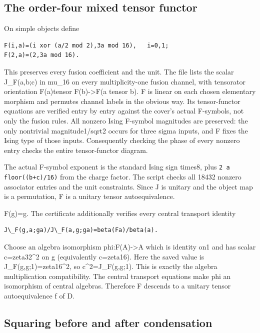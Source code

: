 \hypertarget{the-order-four-mixed-tensor-functor}{%
\subsection{The order-four mixed tensor
functor}\label{the-order-four-mixed-tensor-functor}}

On simple objects define

\begin{verbatim}
F(i,a)=(i xor (a/2 mod 2),3a mod 16),   i=0,1;
F(2,a)=(2,3a mod 16).
\end{verbatim}

This preserves every fusion coefficient and the unit. The file lists the
scalar J\_F(a,b;c) in mu\_16 on every multiplicity-one fusion channel,
with tensorator orientation F(a)tensor F(b)-\textgreater F(a tensor b).
F is linear on each chosen elementary morphism and permutes channel
labels in the obvious way. Its tensor-functor equations are verified
entry by entry against the cover's actual F-symbols, not only the fusion
rules. All nonzero Ising F-symbol magnitudes are preserved: the only
nontrivial magnitude1/sqrt2 occurs for three sigma inputs, and F fixes
the Ising type of those inputs. Consequently checking the phase of every
nonzero entry checks the entire tensor-functor diagram.

The actual F-symbol exponent is the standard Ising sign times8, plus
\texttt{2 a fl\allowbreak{}oor((b\allowbreak{}+c)/\allowbreak{}16)} from
the charge factor. The script checks all 18432 nonzero associator
entries and the unit constraints. Since J is unitary and the object map
is a permutation, F is a unitary tensor autoequivalence.

F(g)=g. The certificate additionally verifies every central transport
identity

\begin{verbatim}
J\_F(g,a;ga)/J\_F(a,g;ga)=beta(Fa)/beta(a).
\end{verbatim}

Choose an algebra isomorphism phi:F(A)-\textgreater A which is identity
on1 and has scalar c=zeta32\^{}2 on g (equivalently c=zeta16). Here the
saved value is J\_F(g,g;1)=zeta16\^{}2, so c\^{}2=J\_F(g,g;1). This is
exactly the algebra multiplication compatibility. The central transport
equations make phi an isomorphism of central algebras. Therefore F
descends to a unitary tensor autoequivalence f of D.

\hypertarget{squaring-before-and-after-condensation}{%
\subsection{Squaring before and after
condensation}\label{squaring-before-and-after-condensation}}

